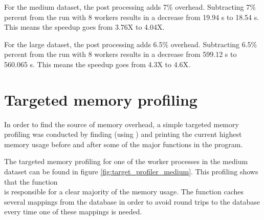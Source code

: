 For the medium dataset, the post processing adds 7\% overhead. Subtracting 7\% percent from the run with 8 workers results in a decrease
from 19.94 s to 18.54 s. This means the speedup goes from 3.76X to 4.04X.

For the large dataset, the post processing adds 6.5\% overhead. Subtracting 6.5\% percent from the run with 8 workers results in a decrease
from 599.12 s to 560.065 s. This means the speedup goes from 4.3X to 4.6X.

\section{Targeted memory profiling} \label{targeted_memory_profiling}
In order to find the source of memory overhead, a simple targeted memory profiling was conducted by finding (using ) and
printing the current highest memory usage before and after some of the major functions in the program.

The targeted memory profiling for one of the worker processes in the medium dataset can be found in figure \ref{fig:target_profiler_medium}.
This profiling shows that the function \\  is responsible for a clear majority of the memory usage.
The function caches several mappings from the database in order to avoid round trips to the database every time one of these mappings is needed.

